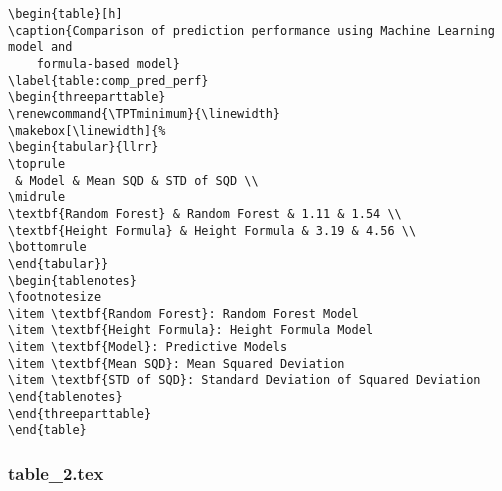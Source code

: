 \documentclass[11pt]{article}
\begin{document}
\begin{Verbatim}[tabsize=4]
\begin{table}[h]
\caption{Comparison of prediction performance using Machine Learning model and
	formula-based model}
\label{table:comp_pred_perf}
\begin{threeparttable}
\renewcommand{\TPTminimum}{\linewidth}
\makebox[\linewidth]{%
\begin{tabular}{llrr}
\toprule
 & Model & Mean SQD & STD of SQD \\
\midrule
\textbf{Random Forest} & Random Forest & 1.11 & 1.54 \\
\textbf{Height Formula} & Height Formula & 3.19 & 4.56 \\
\bottomrule
\end{tabular}}
\begin{tablenotes}
\footnotesize
\item \textbf{Random Forest}: Random Forest Model
\item \textbf{Height Formula}: Height Formula Model
\item \textbf{Model}: Predictive Models
\item \textbf{Mean SQD}: Mean Squared Deviation
\item \textbf{STD of SQD}: Standard Deviation of Squared Deviation
\end{tablenotes}
\end{threeparttable}
\end{table}

\end{Verbatim}

\subsubsection*{table\_2.tex}
\end{document}
